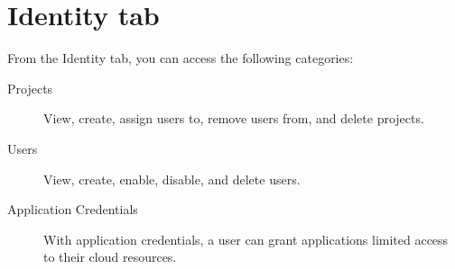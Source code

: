 \section*{Identity tab}\label{sec:identity-tab}
From the Identity tab, you can access the following categories:

\begin{description}
\item[Projects] View, create, assign users to, remove users from, and delete
  projects.
\item[Users] View, create, enable, disable, and delete users.
\item[Application Credentials] With application credentials, a user
  can grant applications limited access to their cloud resources.
\end{description}

